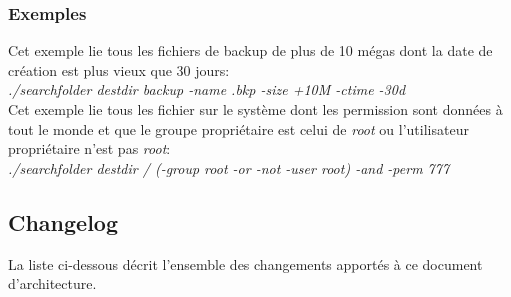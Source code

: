 \documentclass[11pt, a4paper]{article}
\begin{document}
\subsubsection{Exemples}

Cet exemple lie tous les fichiers de backup de plus de 10 mégas dont la date de création est plus vieux que 30 jours: \\
\textit{./searchfolder destdir backup -name .bkp -size +10M -ctime -30d} \\

Cet exemple lie tous les fichier sur le système dont les permission sont données à tout le monde et
que le groupe propriétaire est celui de \textit{root} ou l'utilisateur propriétaire n'est pas \textit{root}: \\
\textit{./searchfolder destdir / (-group root -or -not -user root) -and -perm 777}

\newpage

\subsection{Changelog}

La liste ci-dessous décrit l'ensemble des changements apportés à ce document d'architecture.
\end{document}
